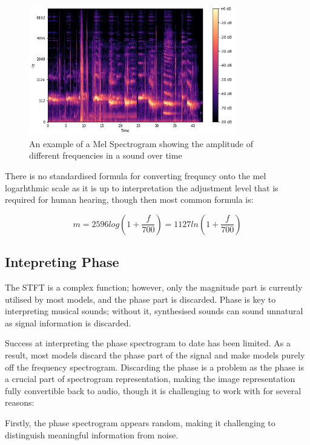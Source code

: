\begin{figure}[!ht]
    \centering
    \includegraphics[width=0.8\textwidth]{literature_review/MelSpectrogram.png}
    \caption{An example of a  Mel Spectrogram showing the amplitude of different frequencies in a sound over time\cite{GettingToKnowTheMelSpectrogram}}
    \label{fig:spectrograms}
\end{figure}

There is no standardised formula for converting frequncy onto the mel logarhthmic scale as it is up to interpretation the adjustment level that is required for human hearing, though then most common formula is\cite{SpeechCommunication}:

\begin{equation}
    m = 2596 log(1 +  \frac{f}{700}) = 1127 ln (1 + \frac{f}{700})
\end{equation}

\subsection{Intepreting Phase}

The STFT is a complex function; however, only the magnitude part is currently utilised by most models, and the phase part is discarded. Phase is key to interpreting musical sounds; without it, synthesised sounds can sound unnatural as signal information is discarded.

Success at interpreting the phase spectrogram to date has been limited. As a result, most models discard the phase part of the signal and make models purely off the frequency spectrogram. Discarding the phase is a problem as the phase is a crucial part of spectrogram representation, making the image representation fully convertible back to audio, though it is challenging to work with for several reasons:

Firstly, the phase spectrogram appears random, making it challenging to distinguish meaningful information from noise.

